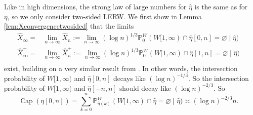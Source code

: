 \documentclass{article}
\DeclareMathOperator{\Ca}{Cap}
\renewcommand{\P}{\mathbb{P}}
\newcommand{\1}{\mathbf{1}}
\newcommand{\limn}{\lim_{n\rightarrow\infty}}
\newcommand{\heta}{\hat\eta}
\theoremstyle{definition}
\numberwithin{equation}{section}
\numberwithin{theorem}{section}
\begin{document}
Like in high dimensions, the strong law of large numbers for $\heta$ is the same as for $\eta$, so we only consider two-sided LERW. We first show in Lemma \ref{lem:Xconvergencetwosided} that the limits
\begin{equation}\label{eq:sketchXinf}
	\begin{split}
		\hat{X}_{\infty}=&\limn\hat{X}_n:=\limn(\log n)^{1/3}\P_0^W(W[1,\infty)\cap\heta[0,n]=\varnothing\mid\heta)\\
	\hat{X}^+_{\infty}=&\limn\hat{X}^+_n:=\limn(\log n)^{1/3}\P_0^W(W[1,\infty)\cap\heta[1,n]=\varnothing\mid\heta)\\
	\end{split}
\end{equation}
exist, building on a very similar result from \cite{lawler19fourdimensional}. In other words, the intersection probability of $W[1,\infty)$ and $\heta[0,n]$ decays like $(\log n)^{-1/3}$. So the intersection probability of $W[1,\infty)$ and $\heta[-n,n]$ should decay like $(\log n)^{-2/3}$. So
\begin{equation}
	\Ca(\eta[0,n])=\sum_{k=0}^n\P_{\heta(k)}^W(W[1,\infty)\cap\heta=\varnothing\mid\heta)\asymp(\log n)^{-2/3}n.
\end{equation}
\end{document}
